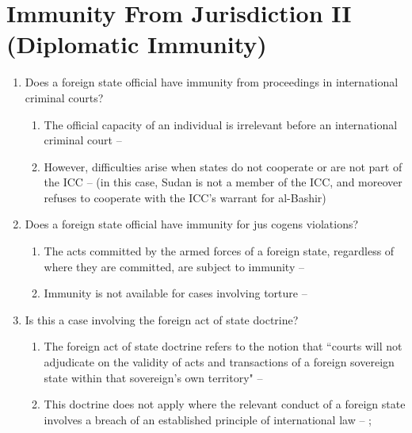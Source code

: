 \section{Immunity From Jurisdiction II (Diplomatic Immunity)}
\begin{enumerate}
    \item Does a foreign state official have immunity from proceedings in international criminal courts?
    \begin{enumerate}
        \item The official capacity of an individual is irrelevant before an international criminal court -- 
        \item However, difficulties arise when states do not cooperate or are not part of the ICC --  (in this case, Sudan is not a member of the ICC, and moreover refuses to cooperate with the ICC's warrant for al-Bashir)
    \end{enumerate}
    \item Does a foreign state official have immunity for \gls{jus cogens} violations?
    \begin{enumerate}
        \item The acts committed by the armed forces of a foreign state, regardless of where they are committed, are subject to immunity -- 
        \item Immunity is not available for cases involving torture -- 
    \end{enumerate}
    \item Is this a case involving the foreign act of state doctrine?
    \begin{enumerate}
        \item The foreign act of state doctrine refers to the notion that ``courts will not adjudicate on the validity of acts and transactions of a foreign sovereign state within that sovereign's own territory" -- 
        \item This doctrine does not apply where the relevant conduct of a foreign state involves a breach of an established principle of international law -- ; 
    \end{enumerate}

\end{enumerate}
